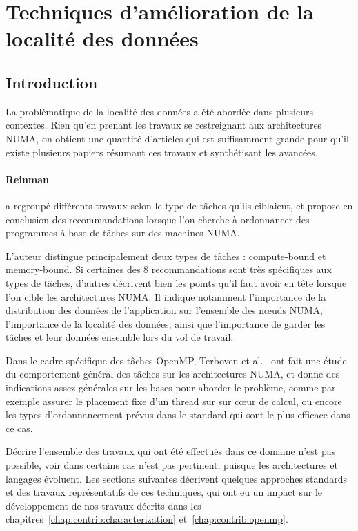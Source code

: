 \section{Techniques d'amélioration de la localité des données}\label{sec:rw:numa}

\subsection{Introduction}

La problématique de la localité des données a été abordée dans plusieurs contextes.
Rien qu'en prenant les travaux se restreignant aux architectures NUMA, on obtient une quantité d'articles qui est suffisamment grande pour qu'il existe plusieurs papiers résumant ces travaux et synthétisant les avancées.

\paragraph{Reinman~\cite{Reinman2015}} a regroupé différents travaux selon le type de tâches qu'ils ciblaient, et propose en conclusion des recommandations lorsque l'on cherche à ordonnancer des programmes à base de tâches sur des machines NUMA.

L'auteur distingue principalement deux types de tâches : compute-bound et memory-bound.
Si certaines des 8 recommandations sont très spécifiques aux types de tâches, d'autres décrivent bien les points qu'il faut avoir en tête lorsque l'on cible les architectures NUMA.
Il indique notamment l'importance de la distribution des données de l'application sur l'ensemble des nœuds NUMA, l'importance de la localité des données, ainsi que l'importance de garder les tâches et leur données ensemble lors du vol de travail.

Dans le cadre spécifique des tâches OpenMP, Terboven et al.~\cite{Terboven2012} ont fait une étude du comportement général des tâches sur les architectures NUMA, et donne des indications assez générales sur les bases pour aborder le problème, comme par exemple assurer le placement fixe d'un thread sur sur cœur de calcul, ou encore les types d'ordonnancement prévus dans le standard qui sont le plus efficace dans ce cas.

Décrire l'ensemble des travaux qui ont été effectués dans ce domaine n'est pas possible, voir dans certains cas n'est pas pertinent, puisque les architectures et langages évoluent.
Les sections suivantes décrivent quelques approches standards et des travaux représentatifs de ces techniques, qui ont eu un impact sur le développement de nos travaux décrits dans les chapitres~\ref{chap:contrib:characterization} et~\ref{chap:contrib:openmp}.



